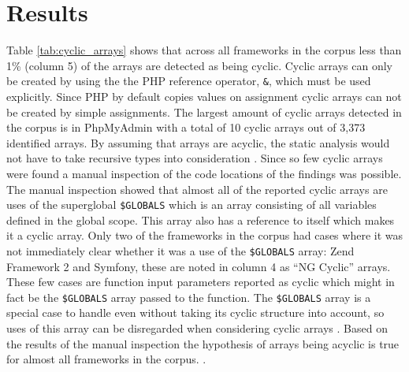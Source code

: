 \section{Results}
\label{sec:analysisResults}
Table \ref{tab:cyclic_arrays} shows that across all frameworks in the corpus less than 1\% (column 5) of the arrays are detected as being cyclic. Cyclic arrays can only be created by using the the PHP reference operator, \texttt{\&}, which must be used explicitly. Since PHP by default copies values on assignment cyclic arrays can not be created by simple assignments. The largest amount of cyclic arrays detected in the corpus is in PhpMyAdmin with a total of 10 cyclic arrays out of 3,373 identified arrays. By assuming that arrays are acyclic, the static analysis would not have to take recursive types into consideration . Since so few cyclic arrays were found a manual inspection of the code locations of the findings was possible. The manual inspection showed that almost all of the reported cyclic arrays are uses of the superglobal \texttt{\$GLOBALS} which is an array consisting of all variables defined in the global scope. This array also has a reference to itself which makes it a cyclic array. Only two of the frameworks in the corpus had cases where it was not immediately clear whether it was a use of the \texttt{\$GLOBALS} array: Zend Framework 2 and Symfony, these are noted in column 4 as ``NG Cyclic'' arrays. These few cases are function input parameters reported as cyclic which might in fact be the \texttt{\$GLOBALS} array passed to the function. The \texttt{\$GLOBALS} array is a special case to handle  even without taking its cyclic structure into account, so uses of this array can be disregarded when considering cyclic arrays . Based on the results of the manual inspection the hypothesis of arrays being acyclic is true for almost all frameworks in the corpus. .

